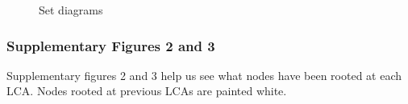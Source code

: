 \begin{figure}
\newline{}\newline{}\caption{Set diagrams}\label{fig:unnamed-chunk-15}
\end{figure}

\hypertarget{supplementary-figures-2-and-3}{%
\subsubsection{Supplementary Figures 2 and
3}\label{supplementary-figures-2-and-3}}

Supplementary figures 2 and 3 help us see what nodes have been rooted at
each LCA. Nodes rooted at previous LCAs are painted white.

